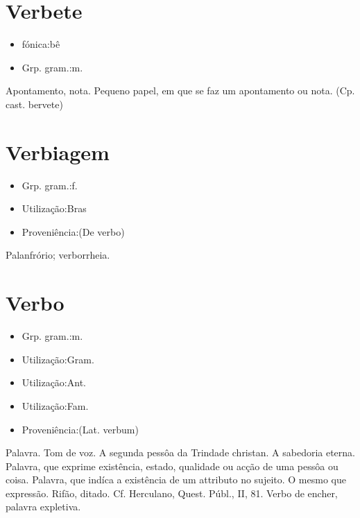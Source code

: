 \documentclass{article}
\begin{document}
\section{Verbete}
\begin{itemize}
\item {fónica:bê}
\end{itemize}
\begin{itemize}
\item {Grp. gram.:m.}
\end{itemize}
Apontamento, nota.
Pequeno papel, em que se faz um apontamento ou nota.
(Cp. cast. \textunderscore bervete\textunderscore )
\section{Verbiagem}
\begin{itemize}
\item {Grp. gram.:f.}
\end{itemize}
\begin{itemize}
\item {Utilização:Bras}
\end{itemize}
\begin{itemize}
\item {Proveniência:(De \textunderscore verbo\textunderscore )}
\end{itemize}
Palanfrório; verborrheia.
\section{Verbo}
\begin{itemize}
\item {Grp. gram.:m.}
\end{itemize}
\begin{itemize}
\item {Utilização:Gram.}
\end{itemize}
\begin{itemize}
\item {Utilização:Ant.}
\end{itemize}
\begin{itemize}
\item {Utilização:Fam.}
\end{itemize}
\begin{itemize}
\item {Proveniência:(Lat. \textunderscore verbum\textunderscore )}
\end{itemize}
Palavra.
Tom de voz.
A segunda pessôa da Trindade christan.
A sabedoria eterna.
Palavra, que exprime existência, estado, qualidade ou acção de uma pessôa ou coisa.
Palavra, que indíca a existência de um attributo no sujeito.
O mesmo que \textunderscore expressão\textunderscore .
Rifão, ditado. Cf. Herculano, \textunderscore Quest. Públ.\textunderscore , II, 81.
\textunderscore Verbo de encher\textunderscore , palavra expletiva.
\end{document}
